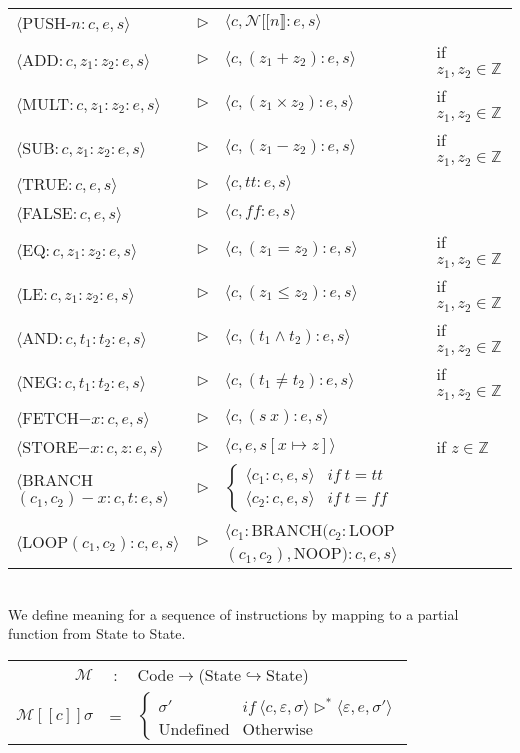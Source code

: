 \documentclass[11pt,a4paper]{article}
\begin{document}
\begin{tabular}{lcll}
$\langle$PUSH-$n:c,e,s\rangle$&$\rhd$&$\langle c,\mathcal{N}[[n\rrbracket:e,s\rangle$\\
$\langle$ADD$:c,z_1:z_2:e,s\rangle$&$\rhd$&$\langle c,(z_1+z_2):e,s\rangle$&if $z_1,z_2\in\mathbb{Z}$\\
$\langle$MULT$:c,z_1:z_2:e,s\rangle$&$\rhd$&$\langle c,(z_1\times z_2):e,s\rangle$&if $z_1,z_2\in\mathbb{Z}$\\
$\langle$SUB$:c,z_1:z_2:e,s\rangle$&$\rhd$&$\langle c,(z_1-z_2):e,s\rangle$&if $z_1,z_2\in\mathbb{Z}$\\
$\langle$TRUE$:c,e,s\rangle$&$\rhd$&$\langle c,tt:e,s\rangle$\\
$\langle$FALSE$:c,e,s\rangle$&$\rhd$&$\langle c,ff:e,s\rangle$\\
$\langle$EQ$:c,z_1:z_2:e,s\rangle$&$\rhd$&$\langle c,(z_1=z_2):e,s\rangle$&if $z_1,z_2\in\mathbb{Z}$\\
$\langle$LE$:c,z_1:z_2:e,s\rangle$&$\rhd$&$\langle c,(z_1\leq z_2):e,s\rangle$&if $z_1,z_2\in\mathbb{Z}$\\
$\langle$AND$:c,t_1:t_2:e,s\rangle$&$\rhd$&$\langle c,(t_1\wedge t_2):e,s\rangle$&if $z_1,z_2\in\mathbb{Z}$\\
$\langle$NEG$:c,t_1:t_2:e,s\rangle$&$\rhd$&$\langle c,(t_1\neq t_2):e,s\rangle$&if $z_1,z_2\in\mathbb{Z}$\\
$\langle$FETCH$-x:c,e,s\rangle$&$\rhd$&$\langle c,(s\ x):e,s\rangle$\\
$\langle$STORE$-x:c,z:e,s\rangle$&$\rhd$&$\langle c,e,s[x\mapsto z]\rangle$&if $z\in\mathbb{Z}$\\
$\langle$BRANCH$(c_1,c_2)-x:c,t:e,s\rangle$&$\rhd$&$\begin{cases}\langle c_1:c,e,s\rangle&if\ t=tt\\\langle c_2:c,e,s\rangle&if\ t=ff\end{cases}$\\
$\langle$LOOP$(c_1,c_2):c,e,s\rangle$&$\rhd$&$\langle c_1:$BRANCH$(c_2:$LOOP$(c_1,c_2),$NOOP$):c,e,s\rangle$
\end{tabular}
\\

We define meaning for a sequence of instructions by mapping to a partial function from State to State.\\
\begin{tabular}{rcl}
$\mathcal{M}$&:&Code$\to$(State$\hookrightarrow$State)\\
$\mathcal{M}[[c]]\sigma$&=&$\begin{cases}\sigma'& if\ \langle c,\varepsilon,\sigma\rangle\rhd^*\langle\varepsilon,e,\sigma'\rangle\\ \mathrm{Undefined}& \mathrm{Otherwise}\end{cases}$
\end{tabular}
\\
\end{document}
